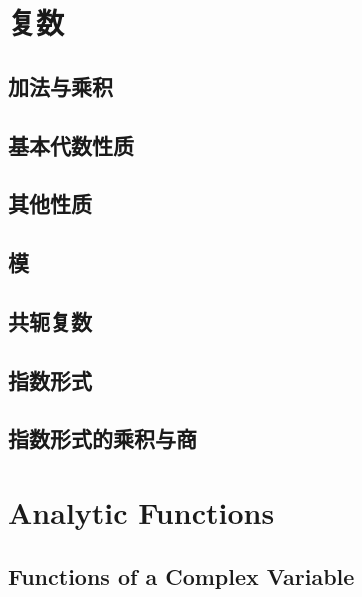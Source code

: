 \documentclass[a4paper, 11pt]{ctexbook}
\begin{document}
    \tableofcontents
    \chapter{复数}
        \section{加法与乘积}
        \section{基本代数性质}
            
        \section{其他性质}
        \section{模}
        \section{共轭复数}
            
        \section{指数形式}
        \section{指数形式的乘积与商}
            
    \chapter{Analytic Functions}
        \section{Functions of a Complex Variable}
            
\end{document}
